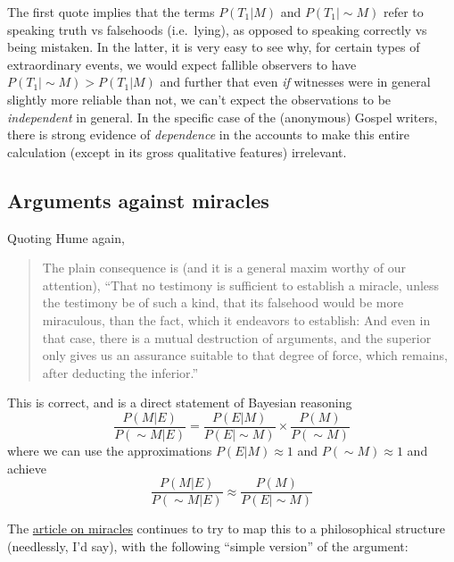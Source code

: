The first quote implies that the terms \(P(T_1|M)\) and
\(P(T_1|\sim\!M)\) refer to speaking truth vs falsehoods (i.e.~lying),
as opposed to speaking correctly vs being mistaken. In the latter, it is
very easy to see why, for certain types of extraordinary events, we
would expect fallible observers to have \(P(T_1|\sim\!M)>P(T_1|M)\) and
further that even \emph{if} witnesses were in general slightly more
reliable than not, we can't expect the observations to be
\emph{independent} in general. In the specific case of the (anonymous)
Gospel writers, there is strong evidence of \emph{dependence} in the
accounts to make this entire calculation (except in its gross
qualitative features) irrelevant.

\subsection{Arguments against miracles}\label{arguments-against-miracles}

Quoting Hume again,

\begin{quote}
The plain consequence is (and it is a general maxim worthy of our
attention), ``That no testimony is sufficient to establish a miracle,
unless the testimony be of such a kind, that its falsehood would be more
miraculous, than the fact, which it endeavors to establish: And even in
that case, there is a mutual destruction of arguments, and the superior
only gives us an assurance suitable to that degree of force, which
remains, after deducting the inferior.''
\end{quote}

This is correct, and is a direct statement of Bayesian reasoning \[
\frac{P(M|E)}{P(\sim\!M|E)} =\frac{P(E|M)}{P(E|\sim\!M)} \times\frac{P(M)}{P(\sim\!M)}
\] where we can use the approximations \(P(E|M)\approx 1\) and
\(P(\sim\!M)\approx 1\) and achieve \[
\frac{P(M|E)}{P(\sim\!M|E)} \approx \frac{P(M)}{P(E|\sim\!M)}
\]

The \href{http://plato.stanford.edu/entries/miracles/}{article on
miracles} continues to try to map this to a philosophical structure
(needlessly, I'd say), with the following ``simple version'' of the
argument:

